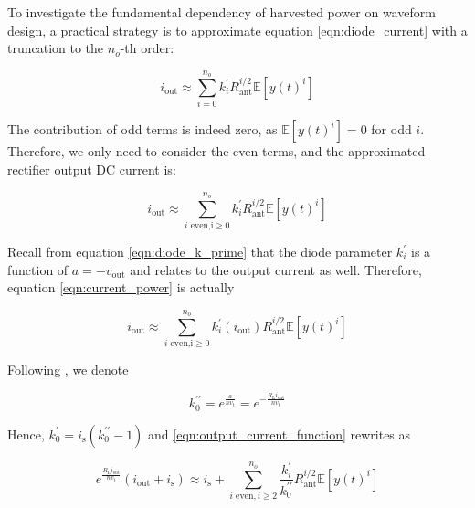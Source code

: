 To investigate the fundamental dependency of harvested power on waveform design, a practical strategy is to approximate equation \ref{eqn:diode_current} with a truncation to the ${n_o}$-th order:

\begin{equation}\label{eqn:output_current_truncation}
  {i_{{\text{out}}}} \approx \sum\limits_{i = 0}^{{n_o}} {k_i^\prime } R_{{\text{ant}}}^{i/2}\mathbb{E}\left[ {y{{(t)}^i}} \right]
\end{equation}

The contribution of odd terms is indeed zero, as $\mathbb{E}\left[ {y{{(t)}^i}} \right] = 0$ for odd $i$. Therefore, we only need to consider the even terms, and the approximated rectifier output DC current is:

\begin{equation}\label{eqn:output_current}
  {i_{{\text{out}}}} \approx \sum\limits_{i{\text{ even,i}} \geqslant 0}^{{n_o}} {k_i^\prime } R_{{\text{ant}}}^{i/2}\mathbb{E}\left[ {y{{(t)}^i}} \right]
\end{equation}

Recall from equation \ref{eqn:diode_k_prime} that the diode parameter $k_i^\prime $ is a function of $a =  - {v_{{\text{out}}}}$ and relates to the output current as well. Therefore, equation \ref{eqn:current_power} is actually

\begin{equation}\label{eqn:output_current_function}
  {i_{{\text{out}}}} \approx \sum\limits_{i{\text{ even,i}} \geqslant 0}^{{n_o}} {k_i^\prime \left( {{i_{{\text{out}}}}} \right)} R_{{\text{ant}}}^{i/2}\mathbb{E}\left[ {y{{(t)}^i}} \right]
\end{equation}

Following \cite{Clerckx2016}, we denote 

\begin{equation}\label{eqn:diode_k_prime_prime}
  k_0^{\prime \prime } = {e^{\frac{a}{{n{v_{\text{t}}}}}}} = {e^{ - \frac{{{R_{\text{L}}}{i_{{\text{out}}}}}}{{n{v_{\text{t}}}}}}}
\end{equation}

Hence, $k_0^\prime  = {i_{\text{s}}}(k_0^{\prime \prime } - 1)$ and \ref{eqn:output_current_function} rewrites as

\begin{equation}\label{eqn:output_current_rewritten}
  {e^{\frac{{{R_{\text{L}}}{i_{{\text{out}}}}}}{{n{v_{\text{t}}}}}}}\left( {{i_{{\text{out}}}} + {i_{\text{s}}}} \right) \approx {i_{\text{s}}} + \sum\limits_{i{\text{ even}},i \geqslant 2}^{{n_o}} {\frac{{k_i^\prime }}{{k_0^{\prime \prime }}}} R_{{\text{ant}}}^{i/2}\mathbb{E}\left[ {y{{(t)}^i}} \right]
\end{equation}

